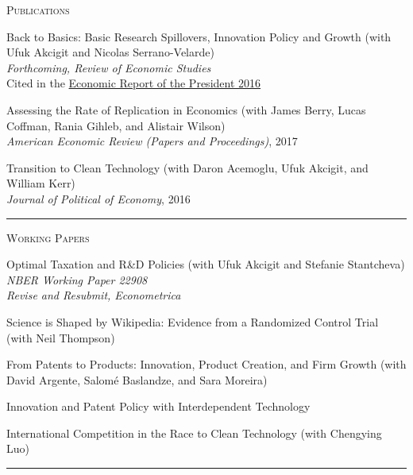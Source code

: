 \documentclass{article}
\begin{document}
\parbox{\textwidth}{
\parbox[t]{0.28\textwidth}{ \raggedright \noindent \textsc{ Publications } }
\parbox[t]{0.72\textwidth}{ \raggedright

Back to Basics: Basic Research Spillovers, Innovation Policy and Growth (with Ufuk Akcigit and Nicolas Serrano-Velarde)  \\
 \textit{Forthcoming, Review of Economic Studies}  \\
 Cited in the \href{https://www.gpo.gov/fdsys/pkg/ERP-2016/pdf/ERP-2016.pdf}{Economic Report of the President 2016}
\vspace{0.27cm}

Assessing the Rate of Replication in Economics (with James Berry, Lucas Coffman, Rania Gihleb, and Alistair Wilson) \\
\textit{American Economic Review (Papers and Proceedings)}, 2017
\vspace{0.27cm}

Transition to Clean Technology (with Daron Acemoglu, Ufuk Akcigit, and William Kerr) \\
\textit{Journal of Political of Economy}, 2016
\vspace{0.27cm}

}
\textcolor{light-gray}{\hrule}
}
\vspace{0.3cm}

\parbox{\textwidth}{
\parbox[t]{0.28\textwidth}{ \raggedright \noindent \textsc{ Working Papers } }
\parbox[t]{0.72\textwidth}{ \raggedright

Optimal Taxation and R\&D Policies (with Ufuk Akcigit and Stefanie Stantcheva)  \\
 \textit{NBER Working Paper 22908}  \\
 \textit{Revise and Resubmit, Econometrica}
\vspace{0.27cm}

Science is Shaped by Wikipedia: Evidence from a Randomized Control Trial (with Neil Thompson)
\vspace{0.27cm}

From Patents to Products: Innovation, Product Creation, and Firm Growth (with David Argente, Salomé Baslandze, and Sara Moreira)
\vspace{0.27cm}

Innovation and Patent Policy with Interdependent Technology
\vspace{0.27cm}

International Competition in the Race to Clean Technology (with Chengying Luo)
\vspace{0.27cm}

}
\textcolor{light-gray}{\hrule}
}
\vspace{0.3cm}
\end{document}
